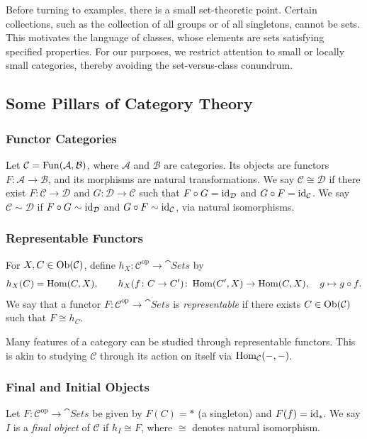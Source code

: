 \documentclass[11pt,a4paper]{article}
\begin{document}
Before turning to examples, there is a small set-theoretic point. Certain collections, such as the collection of all
groups or of all singletons, cannot be sets. This motivates the language of classes,
whose elements are sets satisfying specified properties. For our purposes, we restrict attention to
small or locally small categories, thereby avoiding the set-versus-class
conundrum.
\subsection{Some Pillars of Category Theory}
\subsubsection{Functor Categories}
Let $\mathcal C=\operatorname{Fun}(\mathcal A,\mathcal B)$, where $\mathcal A$ and
$\mathcal B$ are categories. Its objects are functors
$F\colon\mathcal A\to\mathcal B$, and its morphisms are natural transformations.
We say $\mathcal C\cong\mathcal D$ if there exist
$F\colon\mathcal C\to\mathcal D$ and $G\colon\mathcal D\to\mathcal C$ such that
$F\circ G=\operatorname{id}_{\mathcal D}$ and $G\circ F=\operatorname{id}_{\mathcal C}$.
We say $\mathcal C\sim\mathcal D$ if
$F\circ G\sim\operatorname{id}_{\mathcal D}$ and $G\circ F\sim\operatorname{id}_{\mathcal C}$,
via natural isomorphisms.
\subsubsection{Representable Functors}
For $X,C\in\operatorname{Ob}(\mathcal C)$, define
$h_X\colon\mathcal C^{\mathrm{op}}\to\cat{Sets}$ by
\[
 h_X(C)=\operatorname{Hom}(C,X),\qquad
 h_X(f\colon C\to C')\colon\operatorname{Hom}(C',X)\to\operatorname{Hom}(C,X),\quad g\mapsto g\circ f.
\]
We say that a functor $F\colon\mathcal C^{\mathrm{op}}\to\cat{Sets}$ is
\emph{representable} if there exists $C\in\operatorname{Ob}(\mathcal C)$ such that $F\cong h_C$.

Many features of a category can be studied through representable functors.
This is akin to studying $\mathcal C$ through its action on itself via
$\operatorname{Hom}_{\mathcal C}(-,-)$.
\subsubsection{Final and Initial Objects}
Let $F\colon\mathcal C^{\mathrm{op}}\to\cat{Sets}$ be given by
$F(C)=*$ (a singleton) and $F(f)=\operatorname{id}_*$. We say $I$ is a \emph{final object}
of $\mathcal C$ if $h_I\cong F$, where $\cong$ denotes natural isomorphism.
\end{document}
